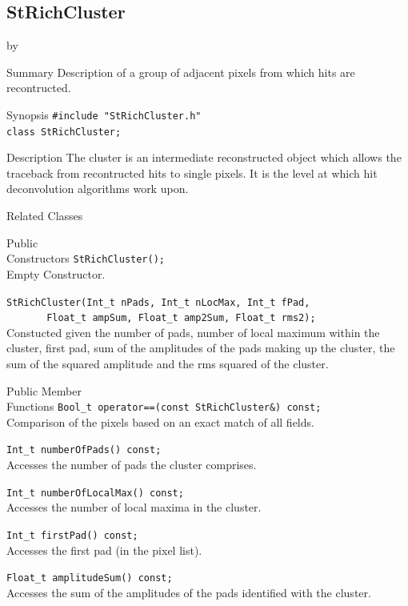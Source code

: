 \documentclass[twoside]{article}
\newcommand{\entrylabel}[1]{\mbox{\textbf{{#1}}}\hfil}%
\newenvironment{entry}
{\begin{list}{}%
    {\renewcommand{\makelabel}{\entrylabel}%
     \setlength{\labelwidth}{90pt}%
     \setlength{\leftmargin}{\labelwidth}
     \advance\leftmargin by \labelsep%
      }%
    }%
  {\end{list}}
\newcommand{\Entrylabel}[1]%
{\raisebox{0pt}[1ex][0pt]{\makebox[\labelwidth][l]%
    {\parbox[t]{\labelwidth}{\hspace{0pt}\textbf{{#1}}}}}}
\newenvironment{Entry}%
{\renewcommand{\entrylabel}{\Entrylabel}\begin{entry}}%
  {\end{entry}}
\begin{document}
\subsection{StRichCluster}
\label{sec:StRichCluster}
\begin{Entry}
\item[Summary] Description of a group of adjacent pixels from
    which hits are recontructed.
\item[Synopsis]
    \verb+#include "StRichCluster.h"+\\
    \verb+class StRichCluster;+\\
\item[Description]   The cluster is an intermediate reconstructed
    object which allows the traceback from recontructed hits to
    single pixels.  It is the level at which hit deconvolution
    algorithms work upon.
\item[Related Classes]
\item[Public\\ Constructors]
    \verb+StRichCluster();+\\
    Empty Constructor.

    \verb+StRichCluster(Int_t nPads, Int_t nLocMax, Int_t fPad, +\\
    \verb+       Float_t ampSum, Float_t amp2Sum, Float_t rms2);+\\
    Constucted given the number of pads, number of local maximum within
    the cluster, first pad, sum of the amplitudes of the pads making
    up the cluster, the sum of the squared amplitude and the rms
    squared of the cluster.

\item[Public Member\\ Functions]
    \verb+Bool_t operator==(const StRichCluster&) const;+\\
    Comparison of the pixels based on an exact match of all fields.

    \verb+Int_t numberOfPads() const;+\\
    Accesses the number of pads the cluster comprises.

    \verb+Int_t numberOfLocalMax() const;+\\
    Accesses the number of local maxima in the cluster.

    \verb+Int_t firstPad() const;+\\
    Accesses the first pad (in the pixel list).

    \verb+Float_t amplitudeSum() const;+\\
    Accesses the sum of the amplitudes of the pads identified
    with the cluster.


\end{Entry}
\end{document}
